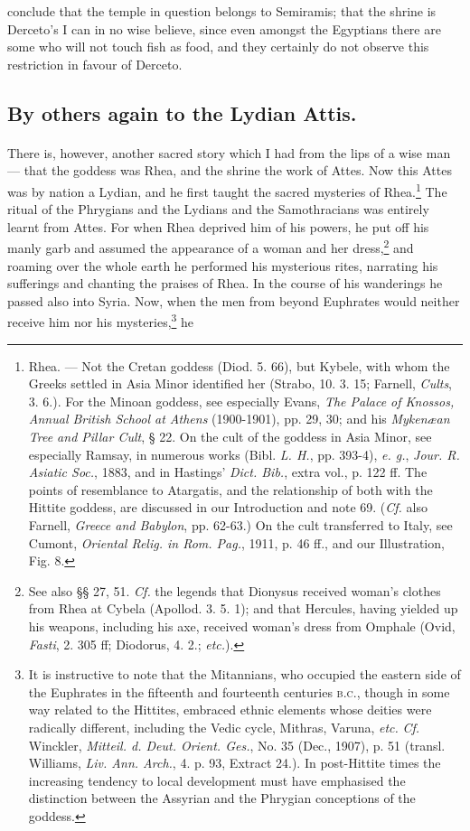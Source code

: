 \documentclass[a4paper, 11pt, oneside, polutonikogreek, english]{article}
\begin{document}
conclude that the temple in question belongs to Semiramis; that the shrine is Derceto's I can in no wise believe, since even amongst the Egyptians there are some who will not touch fish as food, and they certainly do not observe this restriction in favour of Derceto.

\subsection{By others again to the Lydian Attis.}
\paragraph{}
There is, however, another sacred story which I had from the lips of a wise man --- that the goddess was Rhea, and the shrine the work of Attes. Now this Attes was by nation a Lydian, and he first taught the sacred mysteries of Rhea.\footnote{Rhea. --- Not the Cretan goddess (Diod. 5. 66), but Kybele, with whom the Greeks settled in Asia Minor identified her (Strabo, 10. 3. 15; Farnell, \emph{Cults}, 3. 6.). For the Minoan goddess, see especially Evans, \emph{The Palace of Knossos, Annual British School at Athens} (1900-1901), pp. 29, 30; and his \emph{Mykenæan Tree and Pillar Cult}, § 22. On the cult of the goddess in Asia Minor, see especially Ramsay, in numerous works (Bibl. \emph{L. H.}, pp. 393-4), \emph{e. g.}, \emph{Jour. R. Asiatic Soc.}, 1883, and in Hastings' \emph{Dict. Bib.}, extra vol., p. 122 ff. The points of resemblance to Atargatis, and the relationship of both with the Hittite goddess, are discussed in our Introduction and note 69. (\emph{Cf.} also Farnell, \emph{Greece and Babylon}, pp. 62-63.) On the cult transferred to Italy, see Cumont, \emph{Oriental Relig. in Rom. Pag.}, 1911, p. 46 ff., and our Illustration, Fig. 8.} The ritual of the Phrygians and the Lydians and the Samothracians was entirely learnt from Attes. For when Rhea deprived him of his powers, he put off his manly garb and assumed the appearance of a woman and her dress,\footnote{See also §§ 27, 51. \emph{Cf.} the legends that Dionysus received woman's clothes from Rhea at Cybela (Apollod. 3. 5. 1); and that Hercules, having yielded up his weapons, including his axe, received woman's dress from Omphale (Ovid, \emph{Fasti}, 2. 305 ff; Diodorus, 4. 2.; \emph{etc.}).} and roaming over the whole earth he performed his mysterious rites, narrating his sufferings and chanting the praises of Rhea. In the course of his wanderings he passed also into Syria. Now, when the men from beyond Euphrates would neither receive him nor his mysteries,\footnote{It is instructive to note that the Mitannians, who occupied the eastern side of the Euphrates in the fifteenth and fourteenth centuries \textsc{b.c.}, though in some way related to the Hittites, embraced ethnic elements whose deities were radically different, including the Vedic cycle, Mithras, Varuna, \emph{etc.} \emph{Cf.} Winckler, \emph{Mitteil. d. Deut. Orient. Ges.}, No. 35 (Dec., 1907), p. 51 (transl. Williams, \emph{Liv. Ann. Arch.}, 4. p. 93, Extract 24.). In post-Hittite times the increasing tendency to local development must have emphasised the distinction between the Assyrian and the Phrygian conceptions of the goddess.} he 
\end{document}
